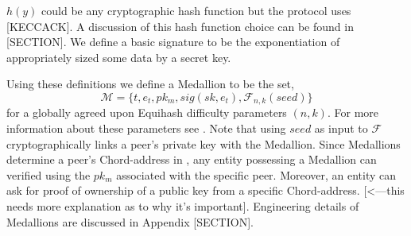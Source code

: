 $h(y)$ could be any cryptographic hash function but the \Orchid{} protocol uses {\color{red} [KECCACK]}. A discussion of this hash function choice can be found in {\color{red}[SECTION]}. We define a basic signature to be the exponentiation of appropriately sized some data by a secret key. 

Using these definitions we define a Medallion to be the set,
						$$\mathcal{M} = \{t, e_t, pk_m, sig(sk,e_t), \mathcal{F}_{n,k}(seed)\}$$
for a globally agreed upon Equihash difficulty parameters $(n,k)$. For more information about these parameters see \cite{Equihash}.  Note that using $seed$ as input to $\mathcal{F}$ cryptographically links a peer's private key with the Medallion. Since Medallions determine a peer's Chord-address in \tOM{}, any entity possessing a Medallion can verified using the $pk_m$ associated with the specific peer. Moreover, an entity can ask for proof of ownership of a public key from a specific Chord-address. {\color{red}[<---this needs more explanation as to why it's important]}. Engineering details of Medallions are discussed in Appendix {\color{red}[SECTION]}. 


%


























